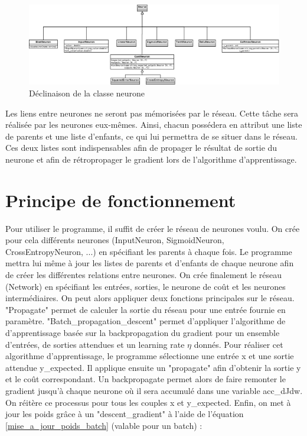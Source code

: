 \documentclass{report}
\theoremstyle{plain}
\theoremstyle{definition}
\theoremstyle{remark}
\begin{document}
\begin{figure}
\begin{center}
\includegraphics[scale=0.18]{images/uml_neurone_imp1.png}
\caption{Déclinaison de la classe neurone}
\label{uml_neurone_imp1}
\end{center}
\end{figure}


Les liens entre neurones ne seront pas mémorisées par le réseau. Cette tâche sera réalisée par les neurones eux-mêmes. Ainsi, chacun possédera en attribut une liste de parents et une liste d'enfants, ce qui lui permettra de se situer dans le réseau. Ces deux listes sont indispensables afin de propager le résultat de sortie du neurone et afin de rétropropager le gradient lors de l'algorithme d'apprentissage.
	
\section{Principe de fonctionnement}
Pour utiliser le programme, il suffit de créer le réseau de neurones voulu. On crée pour cela différents neurones (InputNeuron, SigmoidNeuron, CrossEntropyNeuron, ...) en spécifiant les parents à chaque fois. Le programme mettra lui même à jour les listes de parents et d'enfants de chaque neurone afin de créer les différentes relations entre neurones. On crée finalement le réseau (Network) en spécifiant les entrées, sorties, le neurone de coût et les neurones intermédiaires.
On peut alors appliquer deux fonctions principales sur le réseau. "Propagate" permet de calculer la sortie du réseau pour une entrée fournie en paramètre. "Batch\_propagation\_descent" permet d'appliquer l'algorithme de d'apprentissage basée sur la backpropagation du gradient pour un ensemble d'entrées, de sorties attendues et un learning rate $\eta$ donnés. 
Pour réaliser cet algorithme d'apprentissage, le programme sélectionne une entrée x et une sortie attendue y\_expected. Il applique ensuite un "propagate" afin d'obtenir la sortie y et le coût correspondant. Un backpropagate permet alors de faire remonter le gradient jusqu'à chaque neurone où il sera accumulé dans une variable acc\_dJdw. On réitère ce processus pour tous les couples x et y\_expected. Enfin, on met à jour les poids grâce à un "descent\_gradient" à l'aide de l'équation \ref{mise_a_jour_poids_batch} (valable pour un batch) :
\end{document}
